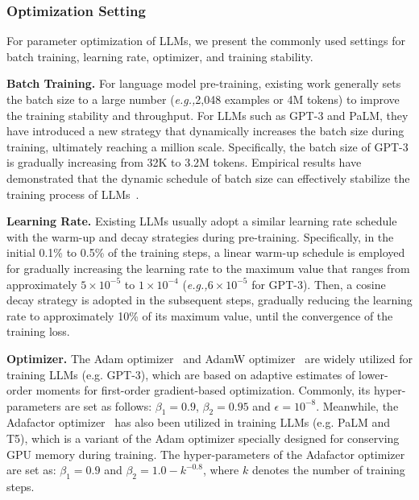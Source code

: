 \subsubsection{Optimization Setting} For parameter optimization of LLMs, we present the commonly used settings for batch training, learning rate, optimizer, and training stability.

\textbf{Batch Training.} For language model pre-training, existing work generally sets the batch size to a large number (\emph{e.g.,}2,048 examples or 4M tokens) to improve the training stability and {throughput}. For LLMs such as GPT-3 and PaLM, they have introduced  a new strategy that dynamically increases the batch size during training, ultimately reaching a million scale. Specifically, the batch size of GPT-3 is gradually increasing from 32K to 3.2M tokens. Empirical results have demonstrated that the dynamic  schedule of batch size can effectively stabilize the training process of LLMs~\cite{Chowdhery-arxiv-2022-PaLM}.

\textbf{Learning Rate.} Existing LLMs usually adopt a similar learning rate schedule with the warm-up and decay strategies during pre-training. Specifically, in the initial 0.1\% to 0.5\% of the training steps, a linear warm-up schedule is employed for gradually increasing the learning rate to the maximum value that ranges from approximately $5 \times 10^{-5}$ to $1 \times 10^{-4}$ (\emph{e.g.,}$6 \times 10^{-5}$ for GPT-3). Then, a cosine decay strategy is adopted in the subsequent steps,  gradually reducing the learning rate to approximately 10\% of its maximum value, until the convergence of the training loss.

\textbf{Optimizer.}
The Adam optimizer~\cite{Kingma-arXiv-2015-Adam} and  {AdamW optimizer~\cite{Loshchilov-arxiv-2017-Fixing}} are widely utilized for training LLMs (e.g. GPT-3), which are based on adaptive estimates of lower-order moments for first-order gradient-based optimization. Commonly, its hyper-parameters are set as follows: $\beta_1 = 0.9$, $\beta_2 = 0.95$ and $\epsilon = 10^{-8}$. Meanwhile, the Adafactor optimizer~\cite{Shazeer-ICML-2018-Adafactor} has also been utilized in training LLMs (e.g. PaLM and T5), which is a variant of the Adam optimizer specially designed for conserving GPU memory during training. The hyper-parameters of the Adafactor optimizer are set as: $\beta_1 = 0.9$ and $\beta_2 = 1.0 - k^{-0.8}$, where $k$ denotes the number of training steps.

